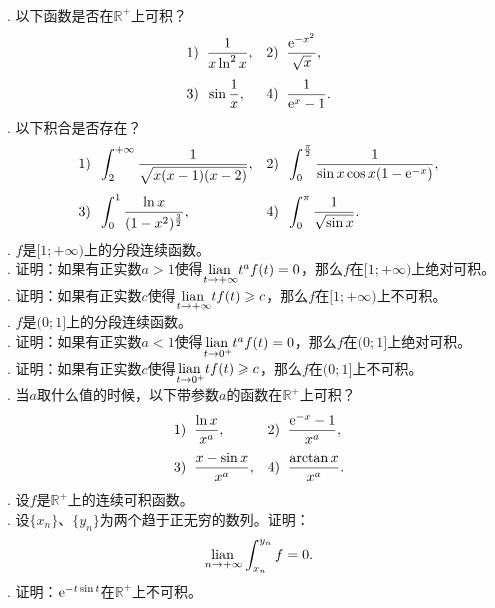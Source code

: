 \documentclass[12pt,UTF8,fontset=none]{ctexbook}
\begin{document}
\begin{xt}
    \mbox{} \\
    . 以下函数是否在$\mathbb{R}^+$上可积？\\    
    \begin{align*}
        1)\;\;& \frac{1}{x\ln^2{x}} ,  &2)\;\;& \frac{\mathrm{e}^{-x^2}}{\sqrt{x}}, \\[3pt]
        3)\;\;& \sin{\frac{1}{x}},  & 4)\;\;& \frac{1}{\mathrm{e}^x  - 1}.
    \end{align*}
    . 以下积合是否存在？\\    
    \begin{align*}
        1)\;\;& \int_2^{+\infty} \frac{1}{\sqrt{x(x - 1)(x - 2)}},  &2)\;\;& \int_0^{\frac{\pi}{2}} \frac{1}{\sin{x}\cos{x}(1 - \mathrm{e}^{-x})}, \\[3pt]
        3)\;\;& \int_0^{1} \frac{\ln{x}}{(1 - x^2)^{\frac{3}{2}}} , & 4)\;\;& \int_0^{\pi} \frac{1}{\sqrt{\sin{x}}}.
    \end{align*}
    . $f$是$[1;+\infty)$上的分段连续函数。\\
    . 证明：如果有正实数$a>1$使得$\underset{t\to+\infty}{\operatorname{lian}\,} t^a f(t) = 0$，那么$f$在$[1;+\infty)$上绝对可积。\\
    . 证明：如果有正实数$c$使得$\underset{t\to+\infty}{\operatorname{lian}\,} t f(t) \geqslant c$，那么$f$在$[1;+\infty)$上不可积。\\
    . $f$是$(0;1]$上的分段连续函数。\\
    . 证明：如果有正实数$a<1$使得$\underset{t\to 0^+}{\operatorname{lian}\,} t^a f(t) = 0$，那么$f$在$(0;1]$上绝对可积。\\
    . 证明：如果有正实数$c$使得$\underset{t\to 0^+}{\operatorname{lian}\,} t f(t) \geqslant c$，那么$f$在$(0;1]$上不可积。\\
    . 当$a$取什么值的时候，以下带参数$a$的函数在$\mathbb{R}^+$上可积？\\
    \begin{align*}
        1)\;\;& \frac{\ln{x}}{x^a} ,  &2)\;\;& \frac{\mathrm{e}^{-x} - 1}{x^a}, \\[3pt]
        3)\;\;& \frac{x - \sin{x}}{x^a},  & 4)\;\;& \frac{\arctan{x}}{x^a}. 
    \end{align*}
    . 设$f$是$\mathbb{R}^+$上的连续可积函数。\\
    . 设$\{x_n\}$、$\{y_n\}$为两个趋于正无穷的数列。证明：
    $$ \underset{n\to+\infty}{\operatorname{lian}\,}\int_{x_n}^{y_n} f = 0. $$
    . 证明：$\mathrm{e}^{-t\sin{t}}$在$\mathbb{R}^+$上不可积。

\end{xt}
\end{document}
